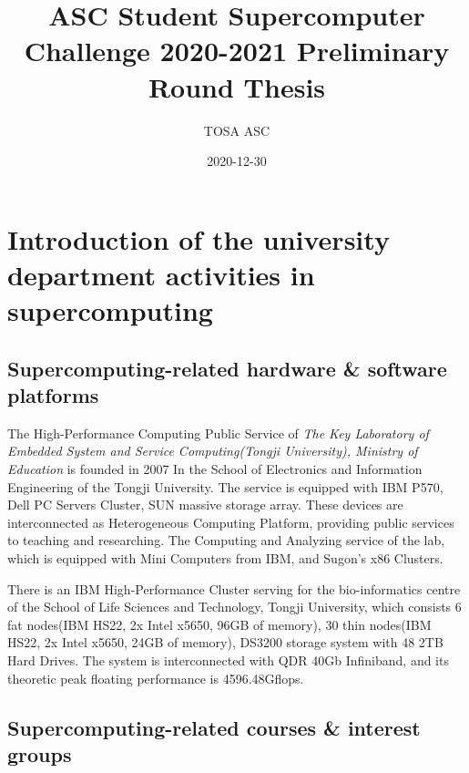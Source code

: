 \documentclass[a4paper, 11pt]{article}
\title{ASC Student Supercomputer Challenge 2020-2021 Preliminary Round Thesis}
\author{TOSA ASC}
\date{2020-12-30}
\begin{document}
	\maketitle
	
	
	\tableofcontents
	\newpage
	
	

	\section{Introduction of the university department activities in supercomputing}
		\subsection{Supercomputing-related hardware \& software platforms} 
		
			The High-Performance Computing Public Service of \textit{The Key Laboratory of Embedded System and Service Computing(Tongji University), Ministry of Education} is founded in 2007 In the School of Electronics and Information Engineering of the Tongji University. The service is equipped with IBM P570, Dell PC Servers Cluster, SUN massive storage array. These devices are interconnected as Heterogeneous Computing Platform, providing public services to teaching and researching. The Computing and Analyzing service of the lab, which is equipped with Mini Computers from IBM, and Sugon's x86 Clusters. 
			
			There is an IBM High-Performance Cluster serving for the bio-informatics centre of the School of Life Sciences and Technology, Tongji University, which consists 6 fat nodes(IBM HS22, 2x Intel x5650, 96GB of memory), 30 thin nodes(IBM HS22, 2x Intel x5650, 24GB of memory), DS3200 storage system with 48 2TB Hard Drives. The system is interconnected with QDR 40Gb Infiniband, and its theoretic peak floating performance is 4596.48Gflops. 
		
		
		\subsection{Supercomputing-related courses \& interest groups} 
		
\end{document}

